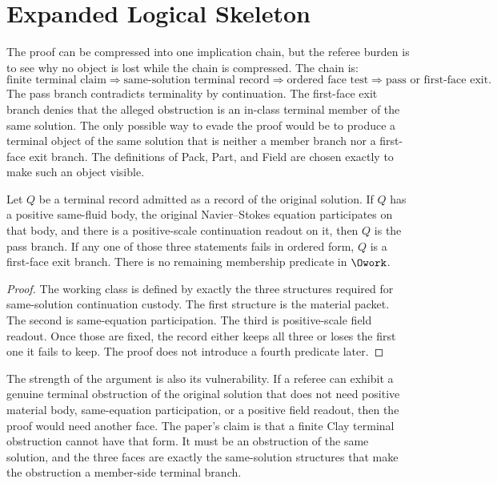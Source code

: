 \section{Expanded Logical Skeleton}

The proof can be compressed into one implication chain, but the referee burden is to see why no object is lost while the chain is compressed.
The chain is:
\[
\text{finite terminal claim}
\Longrightarrow
\text{same-solution terminal record}
\Longrightarrow
\text{ordered face test}
\Longrightarrow
\text{pass or first-face exit}.
\]
The pass branch contradicts terminality by continuation.
The first-face exit branch denies that the alleged obstruction is an in-class terminal member of the same solution.
The only possible way to evade the proof would be to produce a terminal object of the same solution that is neither a member branch nor a first-face exit branch.
The definitions of Pack, Part, and Field are chosen exactly to make such an object visible.

\begin{lemma}
Let \(Q\) be a terminal record admitted as a record of the original solution.
If \(Q\) has a positive same-fluid body, the original Navier--Stokes equation participates on that body, and there is a positive-scale continuation readout on it, then \(Q\) is the pass branch.
If any one of those three statements fails in ordered form, \(Q\) is a first-face exit branch.
There is no remaining membership predicate in \(\Owork\).
\end{lemma}

\begin{proof}
The working class is defined by exactly the three structures required for same-solution continuation custody.
The first structure is the material packet.
The second is same-equation participation.
The third is positive-scale field readout.
Once those are fixed, the record either keeps all three or loses the first one it fails to keep.
The proof does not introduce a fourth predicate later.
\end{proof}

The strength of the argument is also its vulnerability.
If a referee can exhibit a genuine terminal obstruction of the original solution that does not need positive material body, same-equation participation, or a positive field readout, then the proof would need another face.
The paper's claim is that a finite Clay terminal obstruction cannot have that form.
It must be an obstruction of the same solution, and the three faces are exactly the same-solution structures that make the obstruction a member-side terminal branch.

